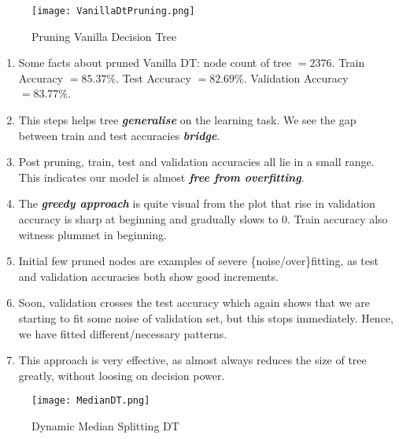 \documentclass{article}
\newcommand{\italb}[1]{\textbf{\textit{#1}}}
\begin{document}
\begin{figure}[h]
\vspace*{-0.5cm}
\hspace*{-1.5cm}
\centering
\texttt{[image: VanillaDtPruning.png]}
\vspace*{-1.5cm}
\caption{Pruning Vanilla Decision Tree}
\vspace*{-0.5cm}
\end{figure}
\begin{enumerate}
	\item Some facts about pruned Vanilla DT: node count of tree $= 2376$. Train Accuracy $=85.37\%$. Test Accuracy $=82.69\%$. Validation Accuracy $=83.77\%$.
	\item This steps helps tree \italb{generalise} on the learning task. We see the gap between train and test accuracies \italb{bridge}.
	\item Post pruning, train, test and validation accuracies all lie in a small range. This indicates our model is almost \italb{free from overfitting}.
	\item The \italb{greedy approach} is quite visual from the plot that rise in validation accuracy is sharp at beginning and gradually slows to 0. Train accuracy also witness plummet in beginning.
	\item Initial few pruned nodes are examples of severe \{noise/over\}fitting, as test and validation accuracies both show good increments.
	\item Soon, validation crosses the test accuracy which again shows that we are starting to fit some noise of validation set, but this stops immediately. Hence, we have fitted different/necessary patterns.
	\item This approach is very effective, as almost always reduces the size of tree greatly, without loosing on decision power. 
\end{enumerate}
\begin{figure}[h]
\vspace*{-0.5cm}
\hspace*{-1.5cm}
\centering
\texttt{[image: MedianDT.png]}
\vspace*{-1.5cm}
\caption{Dynamic Median Splitting DT}
\vspace*{-0.1cm}
\end{figure}
\end{document}
